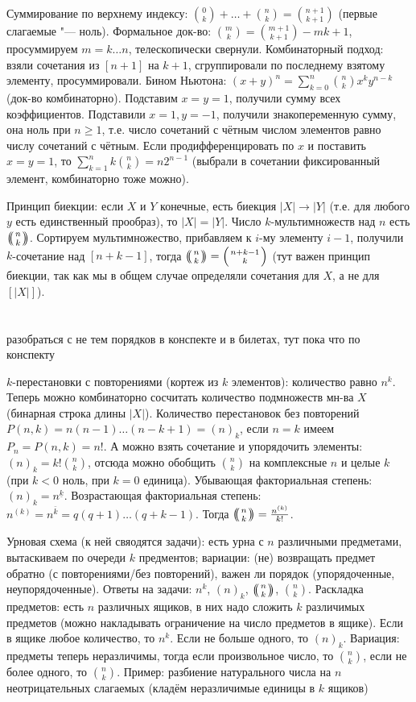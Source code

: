Суммирование по верхнему индексу: $\binom{0}{k}+\dots+\binom{n}{k}=\binom{n+1}{k+1}$ (первые слагаемые "--- ноль).
Формальное док-во: $\binom{m}{k}=\binom{m+1}{k+1}-{m}{k+1}$, просуммируем $m=k\dots n$, телескопически свернули.
Комбинаторный подход: взяли сочетания из $[n+1]$ на $k+1$, сгруппировали по последнему взятому элементу, просуммировали.
Бином Ньютона: $(x+y)^n=\sum_{k=0}^n \binom{n}{k}x^ky^{n-k}$ (док-во комбинаторно).
Подставим $x=y=1$, получили сумму всех коэффициентов.
Подставили $x=1, y=-1$, получили знакопеременную сумму, она ноль при $n\ge 1$,
т.е. число сочетаний с чётным числом элементов равно числу сочетаний с чётным.
Если продифференцировать по $x$ и поставить $x=y=1$, то $\sum_{k=1}^n k\binom{n}{k} = n2^{n-1}$ (выбрали в сочетании фиксированный элемент, комбинаторно тоже можно).

Принцип биекции: если $X$ и $Y$ конечные, есть биекция $|X|\to|Y|$ (т.е. для любого $y$ есть единственный прообраз), то $|X|=|Y|$.
Число $k$-мультимножеств над $n$ есть $\repbinom{n}{k}$.
Сортируем мультимножество, прибавляем к $i$-му элементу $i-1$, получили $k$-сочетание над $[n+k-1]$,
тогда $\repbinom{n}{k}=\binom{n+k-1}{k}$ (тут важен принцип биекции, так как мы в общем случае определяли сочетания для $X$, а не для $[|X|]$).

\section{} %
\TODO разобраться с не тем порядков в конспекте и в билетах, тут пока что по конспекту

$k$-перестановки с повторениями (кортеж из $k$ элементов): количество равно $n^k$.
Теперь можно комбинаторно сосчитать количество подмножеств мн-ва $X$ (бинарная строка длины $|X|$).
Количество перестановок без повторений $P(n, k) = n(n-1)\dots(n-k+1) = (n)_k$, если $n=k$ имеем $P_n=P(n,k)=n!$.
А можно взять сочетание и упорядочить элементы: $(n)_k=k!\binom{n}{k}$, отсюда можно обобщить $\binom{n}{k}$ на
комплексные $n$ и целые $k$ (при $k<0$ ноль, при $k=0$ единица).
Убывающая факториальная степень: $(n)_k=n^{\underline k}$.
Возрастающая факториальная степень: $n^{(k)}=n^{\bar k}=q(q+1)\dots(q+k-1)$.
Тогда $\repbinom{n}{k}=\frac{n^{(k)}}{k!}$.

Урновая схема (к ней свяодятся задачи): есть урна с $n$ различными предметами,
вытаскиваем по очереди $k$ предментов; вариации: (не) возвращать предмет обратно (с повторениями/без повторений),
важен ли порядок (упорядоченные, неупорядоченные).
Ответы на задачи: $n^k$, $(n)_k$, $\repbinom{n}{k}$, $\binom{n}{k}$.
Раскладка предметов: есть $n$ различных ящиков, в них надо сложить $k$ различимых предметов (можно накладывать ограничение
на число предметов в ящике).
Если в ящике любое количество, то $n^k$.
Если не больше одного, то $(n)_k$.
Вариация: предметы теперь неразличимы, тогда если произвольное число, то $\binom{n}{k}$, если не более одного, то $\binom{n}{k}$.
Пример: разбиение натурального числа на $n$ неотрицательных слагаемых (кладём неразличимые единицы в $k$ ящиков)

\section{} %
